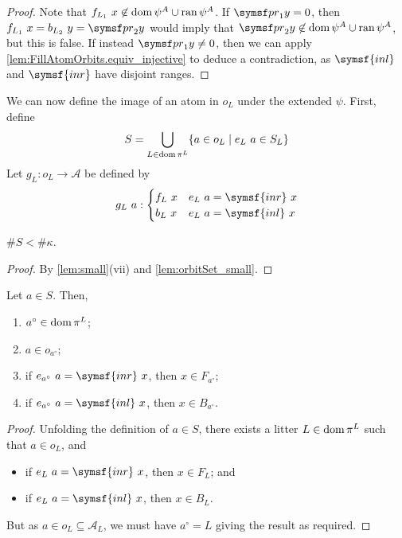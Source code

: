 \begin{proof}
    Note that \( f_{L_1}\ x \not\in \operatorname{dom} \psi^A \cup \operatorname{ran} \psi^A \).
    If \( \pr_1 y = 0 \), then \( f_{L_1}\ x = b_{L_2}\ y = \pr_2 y \) would imply that \( \pr_2 y \not\in \dom \psi^A \cup \ran \psi^A \), but this is false.
    If instead \( \pr_1 y \neq 0 \), then we can apply \cref{lem:FillAtomOrbits.equiv_injective} to deduce a contradiction, as \( \symsf{inl} \) and \( \symsf{inr} \) have disjoint ranges.
\end{proof}
\begin{definition}
    We can now define the image of an atom in \( o_L \) under the extended \( \psi \).
    First, define
    \[ S = \bigcup_{L \in \operatorname{dom} \pi^L} \{ a \in o_L \mid e_L\ a \in S_L \} \]
    Let \( g_L : o_L \to \mathcal A \) be defined by
    \[ g_L\ a : \begin{cases}
        f_L\ x & e_L\ a = \symsf{inr}\ x \\
        b_L\ x & e_L\ a = \symsf{inl}\ x
    \end{cases} \]
\end{definition}
\begin{lemma}
    \label{lem:FillAtomOrbits.S_small}
    \( \#S < \#\kappa \).
\end{lemma}
\begin{proof}
    By \cref{lem:small}(vii) and \cref{lem:orbitSet_small}.
\end{proof}
\begin{lemma}
    \label{lem:orbitSet_equiv_spec}
    Let \( a \in S \).
    Then,
    \begin{enumerate}
        \item \( a^\circ \in \operatorname{dom} \pi^L \);
        \item \( a \in o_{a^\circ} \);
        \item if \( e_{a^\circ}\ a = \symsf{inr}\ x \), then \( x \in F_{a^\circ} \);
        \item if \( e_{a^\circ}\ a = \symsf{inl}\ x \), then \( x \in B_{a^\circ} \).
    \end{enumerate}
\end{lemma}
\begin{proof}
    Unfolding the definition of \( a \in S \), there exists a litter \( L \in \operatorname{dom} \pi^L \) such that \( a \in o_L \), and
    \begin{itemize}
        \item if \( e_L\ a = \symsf{inr}\ x \), then \( x \in F_L \); and
        \item if \( e_L\ a = \symsf{inl}\ x \), then \( x \in B_L \).
    \end{itemize}
    But as \( a \in o_L \subseteq \mathcal A_L \), we must have \( a^\circ = L \) giving the result as required.
\end{proof}
